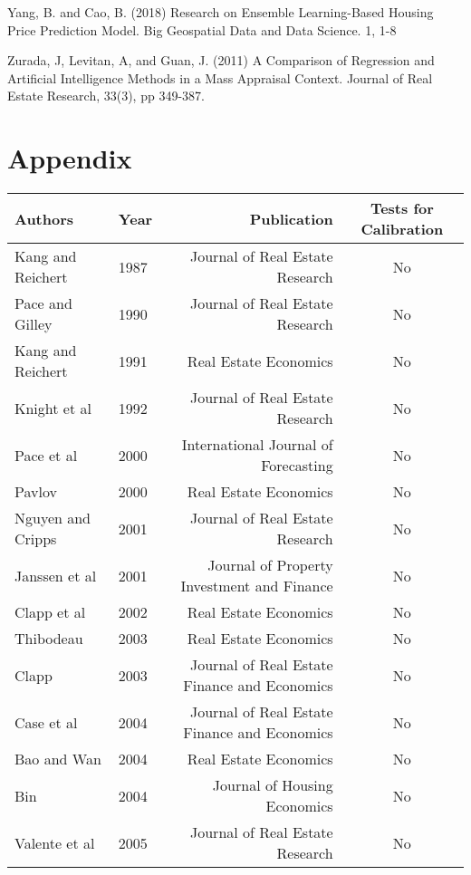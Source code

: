\documentclass[colTwo]{format}
\theoremstyle{definition}
\begin{document}
\begin{thebibliography}{50}
\harvarditem{}{}{}Yang, B. and Cao, B. (2018) Research on Ensemble Learning-Based Housing Price Prediction Model. Big Geospatial Data and Data Science. 1, 1-8

\harvarditem{}{}{}Zurada, J, Levitan, A, and Guan, J. (2011) A Comparison of Regression and Artificial Intelligence Methods in a Mass Appraisal Context. Journal of Real Estate Research, 33(3), pp 349-387. 

\end{thebibliography}

\pagebreak
\pagebreak


\section{Appendix}

\begin{table}[h!]
\centering
\begin{tabular}{|l|l|r|c|}
\hline
\textbf{Authors} & \textbf{Year} & \textbf{Publication} & \textbf{Tests for Calibration}\\
\hline
Kang and Reichert & 1987 & Journal of Real Estate Research & No \\
Pace and Gilley & 1990 & Journal of Real Estate Research & No \\
Kang and Reichert & 1991 & Real Estate Economics & No \\
Knight et al & 1992 & Journal of Real Estate Research & No \\
Pace et al & 2000 & International Journal of Forecasting & No \\
Pavlov & 2000 & Real Estate Economics & No \\
Nguyen and Cripps & 2001 & Journal of Real Estate Research & No \\
Janssen et al & 2001 & Journal of Property Investment and Finance & No \\
Clapp et al & 2002 & Real Estate Economics & No \\
Thibodeau & 2003 & Real Estate Economics & No \\
Clapp & 2003 & Journal of Real Estate Finance and Economics & No \\
Case et al & 2004 & Journal of Real Estate Finance and Economics & No \\
Bao and Wan & 2004 & Real Estate Economics & No \\
Bin & 2004 & Journal of Housing Economics & No \\
Valente et al & 2005 & Journal of Real Estate Research & No \\

\end{tabular}
\end{table}
\end{document}
